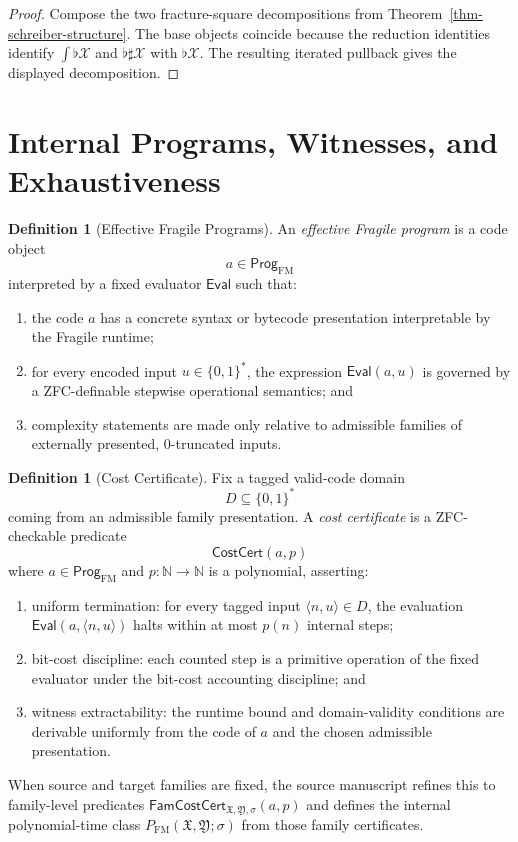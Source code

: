 \documentclass[11pt]{article}
\theoremstyle{definition}
\newtheorem{definition}[theorem]{Definition}
\theoremstyle{remark}
\newcommand{\FM}{\mathrm{FM}}
\newcommand{\Eval}{\mathsf{Eval}}
\newcommand{\CostCert}{\mathsf{CostCert}}
\newcommand{\FamCostCert}{\mathsf{FamCostCert}}
\begin{document}
\begin{proof}
Compose the two fracture-square decompositions from Theorem~\ref{thm-schreiber-structure}. The base objects coincide because the reduction identities identify $\int\flat\mathcal X$ and $\flat\sharp\mathcal X$ with $\flat\mathcal X$. The resulting iterated pullback gives the displayed decomposition.
\end{proof}

\section{Internal Programs, Witnesses, and Exhaustiveness}

\begin{definition}[Effective Fragile Programs]\label{def-effective-programs-fragile}
An \emph{effective Fragile program} is a code object
\[
a \in \mathsf{Prog}_{\FM}
\]
interpreted by a fixed evaluator $\Eval$ such that:
\begin{enumerate}
\item the code $a$ has a concrete syntax or bytecode presentation interpretable by the Fragile runtime;
\item for every encoded input $u \in \{0,1\}^*$, the expression $\Eval(a,u)$ is governed by a ZFC-definable stepwise operational semantics; and
\item complexity statements are made only relative to admissible families of externally presented, $0$-truncated inputs.
\end{enumerate}
\end{definition}

\begin{definition}[Cost Certificate]\label{def-cost-certificate}
Fix a tagged valid-code domain
\[
D \subseteq \{0,1\}^*
\]
coming from an admissible family presentation. A \emph{cost certificate} is a ZFC-checkable predicate
\[
\CostCert(a,p)
\]
where $a \in \mathsf{Prog}_{\FM}$ and $p : \mathbb N \to \mathbb N$ is a polynomial, asserting:
\begin{enumerate}
\item uniform termination: for every tagged input $\langle n, u \rangle \in D$, the evaluation $\Eval(a,\langle n, u \rangle)$ halts within at most $p(n)$ internal steps;
\item bit-cost discipline: each counted step is a primitive operation of the fixed evaluator under the bit-cost accounting discipline; and
\item witness extractability: the runtime bound and domain-validity conditions are derivable uniformly from the code of $a$ and the chosen admissible presentation.
\end{enumerate}
When source and target families are fixed, the source manuscript refines this to family-level predicates $\FamCostCert_{\mathfrak X,\mathfrak Y,\sigma}(a,p)$ and defines the internal polynomial-time class $P_{\FM}(\mathfrak X, \mathfrak Y; \sigma)$ from those family certificates.
\end{definition}
\end{document}
